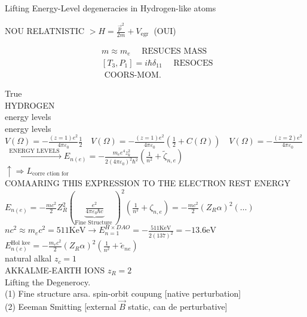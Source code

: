 
\captionsetup{singlelinecheck=false}
Lifting Energy-Level degeneracies in Hydrogen-like atoms

NOU RELATNISTIC $>H=\frac{\vec{p}^{2}}{2 m}+V_{\text {egr }}$ (OUI)

$$
\begin{aligned}
& m \approx m_{e} \quad \text { RESUCES MASS } \\
& {\left[T_{3}, P_{1}\right]=i \hbar \delta_{11} \quad \text { RESOCES }} \\
& \text { COORS-MOM. }
\end{aligned}
$$

True\\
HYDROGEN\\
energy levels\\
energy levels\\
$V(\Omega)=-\frac{(z=1) e^{2}}{4 \pi \varepsilon_{0}} \frac{1}{2} \quad V(\Omega)=-\frac{(z=1) e^{2}}{4 \pi \varepsilon_{0}}\left(\frac{1}{2}+C(\Omega)\right) \quad V(\Omega)=-\frac{(z=2) e^{2}}{4 \pi \varepsilon_{0}}$\\
$\xrightarrow{\text { ENERGY LEVELS }} E_{n(e)}=-\frac{m_{e} e^{4} z_{k}^{2}}{2\left(4 \pi \varepsilon_{0}\right)^{2} \hbar^{2}}\left(\frac{1}{n^{2}}+\widetilde{\zeta}_{n, e}\right)$\\
$\uparrow \Rightarrow L_{\text {corre ction for }}$\\
COMAARING THIS EXPRESSION TO THE ELECTRON REST ENERGY\\
$E_{n(e)}=-\frac{m c^{2}}{2} Z_{R}^{2}(\underbrace{\frac{e^{2}}{4 \pi \varepsilon_{0} \hbar c}}_{\text {Fine Structure }})^{2}\left(\frac{1}{n^{2}}+\zeta_{n, e}\right)=-\frac{m c^{2}}{2}\left(Z_{R} \alpha\right)^{2}(\ldots)$\\
$n c^{2} \approx m_{e} c^{2}=511 \mathrm{KeV} \rightarrow E_{n=1}^{H \times D A O}=-\frac{511 \mathrm{KeV}}{2(137)^{2}}=-13.6 \mathrm{eV}$\\
$E_{n(e)}^{\text {Hol } \mathrm{k} \mathrm{e} \mathrm{e}}=-\frac{m_{e} c^{2}}{2}\left(Z_{R} \alpha\right)^{2}\left(\frac{1}{n^{2}}+\tilde{e}_{n e}\right)$\\
natural alkal $z_{c}=1$\\
AKKALME-EARTH IONS $z_{R}=2$\\
Lifting the Degenerocy.\\[0pt]
(1) Fine structure arsa. spin-orbit coupung [native perturbation]\\
(2) Eeeman Smitting [external $\vec{B}$ static, can de perturbative]

